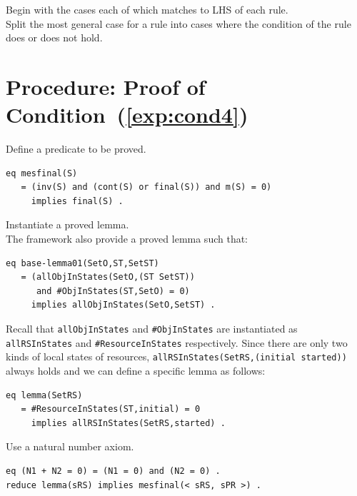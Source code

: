 \documentclass[12pt]{report}
\newcommand{\stt}[1]{{\small{\tt {#1}}}}
\begin{document}
 Begin with the cases each of which matches to
LHS of each rule. \\

 Split the most general case for a rule into
cases where the condition of the rule does or does not hold. 

\section{Procedure: Proof of Condition~(\ref{exp:cond4})}
\label{sec:mesfinal}
 Define a predicate to be proved.
\begin{verbatim}
eq mesfinal(S)
   = (inv(S) and (cont(S) or final(S)) and m(S) = 0)
     implies final(S) .
\end{verbatim}
 Instantiate a proved lemma. \\
The framework also provide a proved lemma such that:
\begin{verbatim}
eq base-lemma01(SetO,ST,SetST)
   = (allObjInStates(SetO,(ST SetST)) 
      and #ObjInStates(ST,SetO) = 0)
     implies allObjInStates(SetO,SetST) .
\end{verbatim}
Recall that {\tt allObjInStates} and {\tt \#ObjInStates} are instantiated
as {\tt allRSInStates} and {\tt \#ResourceInStates} respectively.
Since there are only two kinds of local states of resources,
\stt{allRSInStates(SetRS,(initial started))} always holds and
we can define a specific lemma as follows:
\begin{verbatim}
eq lemma(SetRS)
   = #ResourceInStates(ST,initial) = 0 
     implies allRSInStates(SetRS,started) .
\end{verbatim}
 Use a natural number axiom.
\begin{verbatim}
eq (N1 + N2 = 0) = (N1 = 0) and (N2 = 0) .
reduce lemma(sRS) implies mesfinal(< sRS, sPR >) .
\end{verbatim}
\end{document}
